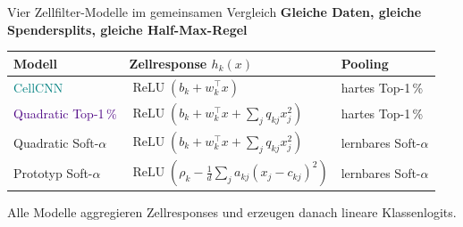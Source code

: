 \documentclass[aspectratio=169,10pt]{beamer}
\newcommand{\eyebrow}[1]{{\color{Teal}\bfseries #1}\par\smallskip}
\begin{document}
\begin{frame}{Vier Zellfilter-Modelle im gemeinsamen Vergleich}
  \eyebrow{Gleiche Daten, gleiche Spendersplits, gleiche Half-Max-Regel}
  \begin{tabular}{@{}p{}p{}p{}@{}}\toprule
    Modell & Zellresponse $h_k(x)$ & Pooling\\\midrule
    \textcolor{Teal}{CellCNN} & $\operatorname{ReLU}(b_k+w_k^\top x)$ & hartes Top-1\,\%\\[2mm]
    \textcolor{Indigo}{Quadratic Top-1\,\%} & $\operatorname{ReLU}(b_k+w_k^\top x+\sum_j q_{kj}x_j^2)$ & hartes Top-1\,\%\\[2mm]
    \textcolor{Amber}{Quadratic Soft-$\alpha$} & $\operatorname{ReLU}(b_k+w_k^\top x+\sum_j q_{kj}x_j^2)$ & lernbares Soft-$\alpha$\\[2mm]
    \textcolor{Rust}{Prototyp Soft-$\alpha$} & $\operatorname{ReLU}(\rho_k-\frac1d\sum_j a_{kj}(x_j-c_{kj})^2)$ & lernbares Soft-$\alpha$\\\bottomrule
  \end{tabular}
  \medskip
  Alle Modelle aggregieren Zellresponses und erzeugen danach lineare Klassenlogits.
\end{frame}
\end{document}

